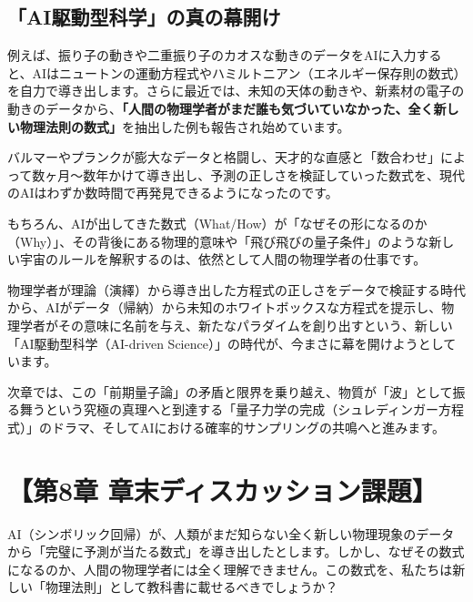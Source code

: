 \subsection{「AI駆動型科学」の真の幕開け}

例えば、振り子の動きや二重振り子のカオスな動きのデータをAIに入力すると、AIはニュートンの運動方程式やハミルトニアン（エネルギー保存則の数式）を自力で導き出します。さらに最近では、未知の天体の動きや、新素材の電子の動きのデータから、\textbf{「人間の物理学者がまだ誰も気づいていなかった、全く新しい物理法則の数式」}を抽出した例も報告され始めています。

バルマーやプランクが膨大なデータと格闘し、天才的な直感と「数合わせ」によって数ヶ月〜数年かけて導き出し、予測の正しさを検証していった数式を、現代のAIはわずか数時間で再発見できるようになったのです。

もちろん、AIが出してきた数式（What/How）が「なぜその形になるのか（Why）」、その背後にある物理的意味や「飛び飛びの量子条件」のような新しい宇宙のルールを解釈するのは、依然として人間の物理学者の仕事です。

物理学者が理論（演繹）から導き出した方程式の正しさをデータで検証する時代から、AIがデータ（帰納）から未知のホワイトボックスな方程式を提示し、物理学者がその意味に名前を与え、新たなパラダイムを創り出すという、新しい「AI駆動型科学（AI-driven Science）」の時代が、今まさに幕を開けようとしています。

次章では、この「前期量子論」の矛盾と限界を乗り越え、物質が「波」として振る舞うという究極の真理へと到達する「量子力学の完成（シュレディンガー方程式）」のドラマ、そしてAIにおける確率的サンプリングの共鳴へと進みます。

\section*{【第8章 章末ディスカッション課題】}

AI（シンボリック回帰）が、人類がまだ知らない全く新しい物理現象のデータから「完璧に予測が当たる数式」を導き出したとします。しかし、なぜその数式になるのか、人間の物理学者には全く理解できません。この数式を、私たちは新しい「物理法則」として教科書に載せるべきでしょうか？




